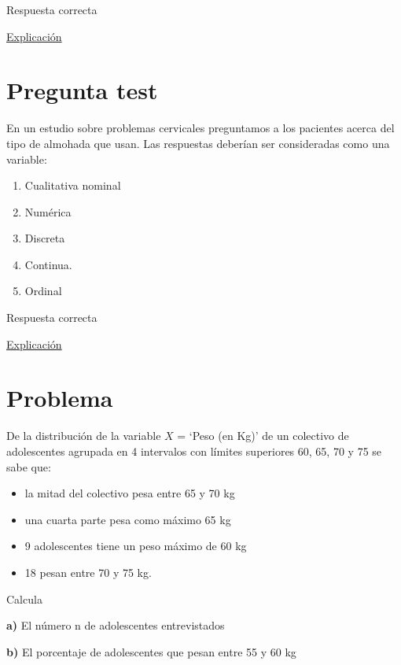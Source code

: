 \documentclass[
]{book}
\providecommand{\tightlist}{%
  \setlength{\itemsep}{0pt}\setlength{\parskip}{0pt}}
\begin{document}
Respuesta correcta

\href{https://1fjmanzano.github.io/bioestadistica/tablas-de-frecuencias.html}{Explicación}

\hypertarget{pregunta-test-5}{%
\section{Pregunta test}\label{pregunta-test-5}}

En un estudio sobre problemas cervicales preguntamos a los pacientes acerca del tipo de almohada que usan. Las respuestas deberían ser consideradas como una variable:

\begin{enumerate}
\def\labelenumi{\alph{enumi})}
\tightlist
\item
  Cualitativa nominal
\item
  Numérica
\item
  Discreta
\item
  Continua.
\item
  Ordinal
\end{enumerate}

Respuesta correcta

\href{https://1fjmanzano.github.io/bioestadistica/tipos-de-variables.html}{Explicación}

\hypertarget{problema-1}{%
\section{Problema}\label{problema-1}}

De la distribución de la variable \(X\) = `Peso (en Kg)' de un colectivo de adolescentes agrupada en 4 intervalos con límites superiores 60, 65, 70 y 75 se sabe que:

\begin{itemize}
\tightlist
\item
  la mitad del colectivo pesa entre 65 y 70 kg
\item
  una cuarta parte pesa como máximo 65 kg
\item
  9 adolescentes tiene un peso máximo de 60 kg
\item
  18 pesan entre 70 y 75 kg.
\end{itemize}

Calcula

\textbf{a)} El número n de adolescentes entrevistados

\textbf{b)} El porcentaje de adolescentes que pesan entre 55 y 60 kg
\end{document}
